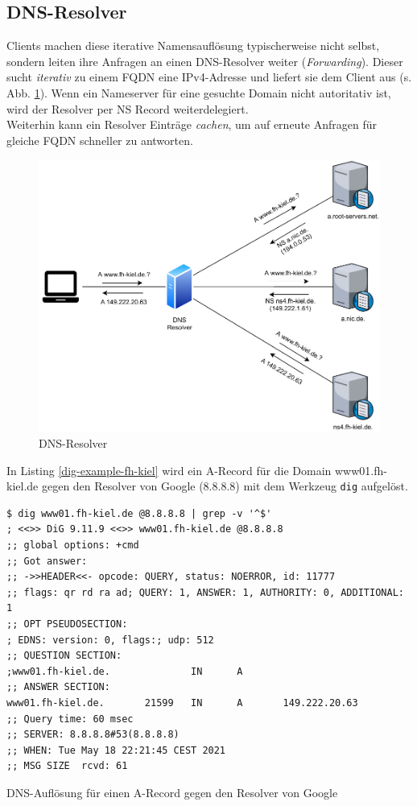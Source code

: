 \subsection{DNS-Resolver}
Clients machen diese iterative Namensauflösung typischerweise nicht selbst, sondern leiten ihre Anfragen an einen DNS-Resolver weiter (\textit{Forwarding}). Dieser sucht \textit{iterativ} zu einem FQDN eine IPv4-Adresse und liefert sie dem Client aus (s. Abb. \ref{grafik: dns-resolver}). Wenn ein Nameserver für eine gesuchte Domain nicht autoritativ ist, wird der Resolver per NS Record weiterdelegiert.\\
Weiterhin kann ein Resolver Einträge \textit{cachen}, um auf erneute Anfragen für gleiche FQDN schneller zu antworten.%
\begin{figure}[h]
  \centering
  \includegraphics[scale=0.7]{Figures/dns_recursion.pdf}
  \caption{DNS-Resolver}
  \label{grafik: dns-resolver}
\end{figure}\FloatBarrier
In Listing \ref{dig-example-fh-kiel} wird ein A-Record für die Domain www01.fh-kiel.de gegen den Resolver von Google (8.8.8.8) mit dem Werkzeug \texttt{dig} aufgelöst.
\begin{listing}[h]
\begin{verbatim}
$ dig www01.fh-kiel.de @8.8.8.8 | grep -v '^$'
; <<>> DiG 9.11.9 <<>> www01.fh-kiel.de @8.8.8.8
;; global options: +cmd
;; Got answer:
;; ->>HEADER<<- opcode: QUERY, status: NOERROR, id: 11777
;; flags: qr rd ra ad; QUERY: 1, ANSWER: 1, AUTHORITY: 0, ADDITIONAL: 1
;; OPT PSEUDOSECTION:
; EDNS: version: 0, flags:; udp: 512
;; QUESTION SECTION:
;www01.fh-kiel.de.              IN      A
;; ANSWER SECTION:
www01.fh-kiel.de.       21599   IN      A       149.222.20.63
;; Query time: 60 msec
;; SERVER: 8.8.8.8#53(8.8.8.8)
;; WHEN: Tue May 18 22:21:45 CEST 2021
;; MSG SIZE  rcvd: 61
\end{verbatim}
\caption{DNS-Auflösung für einen A-Record gegen den Resolver von Google}
\label{dig-example-fh-kiel}
\end{listing}\FloatBarrier

